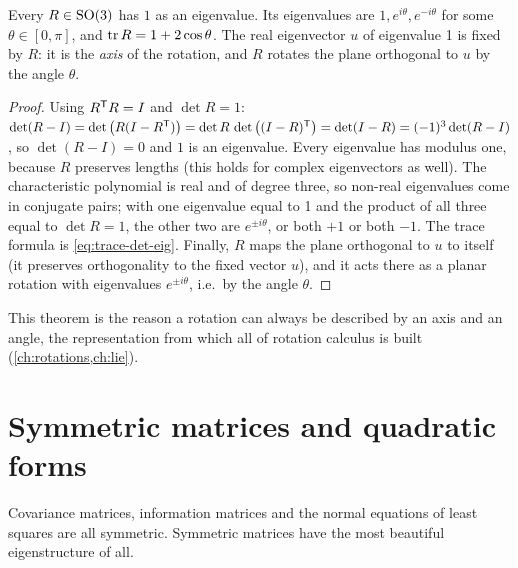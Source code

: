 \begin{theorem}
\label{thm:euler-axis}
Every $R \in \mathrm{SO}(3)$ has $1$ as an eigenvalue. Its eigenvalues are $1, e^{i\theta}, e^{-i\theta}$ for some $\theta \in [0, \pi]$,
and $\operatorname{tr} R = 1 + 2\cos\theta$. The real eigenvector $u$ of eigenvalue 1 is fixed by $R$: it is the \emph{axis} of the
rotation, and $R$ rotates the plane orthogonal to $u$ by the angle $\theta$.
\end{theorem}
\begin{proof}
Using $R^{\mathsf{T}} R = I$ and $\det R = 1$:
$\det(R - I) = \det\big(R(I - R^{\mathsf{T}})\big) = \det R\,\det\big((I - R)^{\mathsf{T}}\big) = \det(I - R) = (-1)^3\det(R - I)$, so $\det(R - I) = 0$ and
$1$ is an eigenvalue. Every eigenvalue has modulus one, because $R$ preserves lengths (this holds for complex eigenvectors as
well). The characteristic polynomial is real and of degree three, so non-real eigenvalues come in conjugate pairs; with
one eigenvalue equal to 1 and the product of all three equal to $\det R = 1$, the other two are $e^{\pm i\theta}$, or both
$+1$ or both $-1$. The trace formula is \eqref{eq:trace-det-eig}. Finally, $R$ maps the plane orthogonal to $u$ to itself
(it preserves orthogonality to the fixed vector $u$), and it acts there as a planar rotation with eigenvalues
$e^{\pm i\theta}$, i.e.\ by the angle $\theta$.
\end{proof}

This theorem is the reason a rotation can always be described by an axis and an angle, the representation from which
all of rotation calculus is built (\cref{ch:rotations,ch:lie}).

\section{Symmetric matrices and quadratic forms}

Covariance matrices, information matrices and the normal equations of least squares are all symmetric. Symmetric
matrices have the most beautiful eigenstructure of all.

